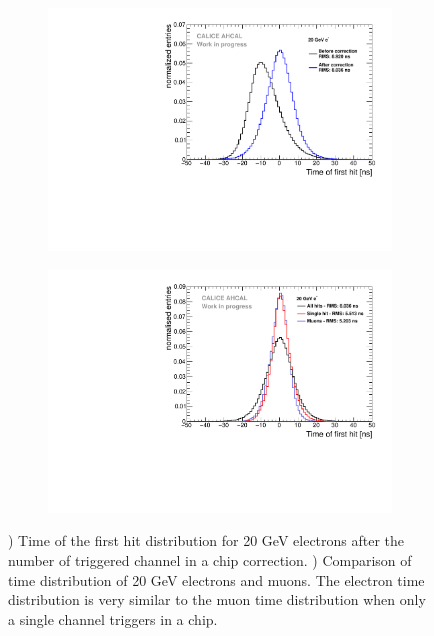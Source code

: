 \begin{figure}[htbp!]
	\begin{subfigure}[t]{0.5\textwidth}
		\centering
		\includegraphics[width=1\textwidth]{../Thesis_Plots/Timing/Electrons/Plots/Timing_AllLayers_20GeV.pdf}
		\caption{}\label{fig:timing_electrons_corr}
	\end{subfigure}
	\hfill
	\begin{subfigure}[t]{0.5\textwidth}
		\centering
		\includegraphics[width=1\textwidth]{../Thesis_Plots/Timing/Electrons/Plots/ComparisonAll_ElectronsSingleHit.pdf}
		\caption{}\label{fig:timing_electron_muon_comp}
	\end{subfigure}
	\caption{) Time of the first hit distribution for 20 GeV electrons after the number of triggered channel in a chip correction. ) Comparison of time distribution of 20 GeV electrons and muons. The electron time distribution is very similar to the muon time distribution when only a single channel triggers in a chip.}
\end{figure}


